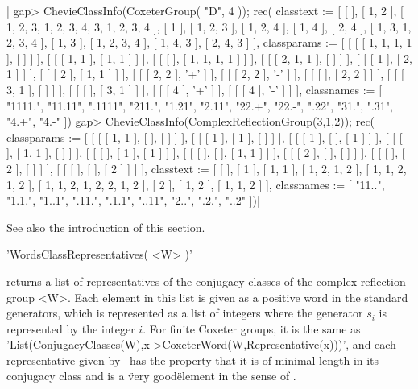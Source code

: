 |    gap> ChevieClassInfo(CoxeterGroup( "D", 4 ));
    rec(
      classtext :=
       [ [  ], [ 1, 2 ], [ 1, 2, 3, 1, 2, 3, 4, 3, 1, 2, 3, 4 ], [ 1 ],
          [ 1, 2, 3 ], [ 1, 2, 4 ], [ 1, 4 ], [ 2, 4 ],
          [ 1, 3, 1, 2, 3, 4 ], [ 1, 3 ], [ 1, 2, 3, 4 ], [ 1, 4, 3 ],
          [ 2, 4, 3 ] ],
      classparams :=
       [ [ [ [ 1, 1, 1, 1 ], [  ] ] ], [ [ [ 1, 1 ], [ 1, 1 ] ] ],
          [ [ [  ], [ 1, 1, 1, 1 ] ] ], [ [ [ 2, 1, 1 ], [  ] ] ],
          [ [ [ 1 ], [ 2, 1 ] ] ], [ [ [ 2 ], [ 1, 1 ] ] ],
          [ [ [ 2, 2 ], '+' ] ], [ [ [ 2, 2 ], '-' ] ],
          [ [ [  ], [ 2, 2 ] ] ], [ [ [ 3, 1 ], [  ] ] ],
          [ [ [  ], [ 3, 1 ] ] ], [ [ [ 4 ], '+' ] ], [ [ [ 4 ], '-' ] ] ],
      classnames := [ "1111.", "11.11", ".1111", "211.", "1.21", "2.11",
          "22.+", "22.-", ".22", "31.", ".31", "4.+", "4.-" ])
    gap> ChevieClassInfo(ComplexReflectionGroup(3,1,2));
      rec(
        classparams :=
         [ [ [ [ 1, 1 ], [  ], [  ] ] ], [ [ [ 1 ], [ 1 ], [  ] ] ],
            [ [ [ 1 ], [  ], [ 1 ] ] ], [ [ [  ], [ 1, 1 ], [  ] ] ],
            [ [ [  ], [ 1 ], [ 1 ] ] ], [ [ [  ], [  ], [ 1, 1 ] ] ],
            [ [ [ 2 ], [  ], [  ] ] ], [ [ [  ], [ 2 ], [  ] ] ],
            [ [ [  ], [  ], [ 2 ] ] ] ],
        classtext :=
         [ [  ], [ 1 ], [ 1, 1 ], [ 1, 2, 1, 2 ], [ 1, 1, 2, 1, 2 ],
            [ 1, 1, 2, 1, 2, 2, 1, 2 ], [ 2 ], [ 1, 2 ], [ 1, 1, 2 ] ],
        classnames := [ "11..", "1.1.", "1..1", ".11.", ".1.1", "..11",
            "2..", ".2.", "..2" ])|

See also the introduction of this section.


'WordsClassRepresentatives( <W> )'

returns  a list of representatives of  the conjugacy classes of the complex
reflection group <W>. Each element in this list is given as a positive word
in  the standard  generators, which  is represented  as a  list of integers
where  the generator  $s_i$ is  represented by  the integer $i$. For finite
Coxeter groups, it is the same as
'List(ConjugacyClasses(W),x->CoxeterWord(W,Representative(x)))',  and  each
representative  given by  \CHEVIE\ has  the property  that it is of minimal
length  in its conjugacy class and is  a \"very good\" element in the sense
of \cite{GM97}.

